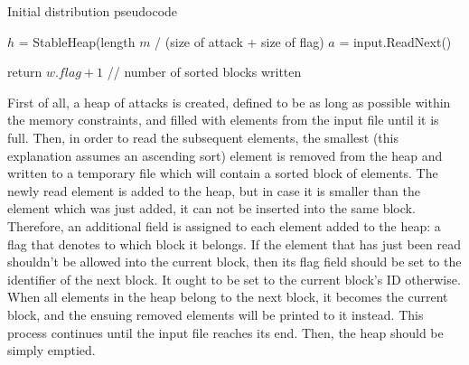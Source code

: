 \documentclass[10pt,a4paper]{article}
\begin{document}
\begin{algorithm}[H]
    \caption{Initial distribution pseudocode}


    \BlankLine
    $h$ = StableHeap(length $m$ / (size of attack + size of flag)\;
    $a$ = input.ReadNext()\;

    return $w.flag + 1$ // number of sorted blocks written\;
\end{algorithm}


First of all, a heap of attacks is created, defined to be as long as possible within the memory constraints, and filled with elements from the input file until it is full. Then, in order to read the subsequent elements, the smallest (this explanation assumes an ascending sort) element is removed from the heap and written to a temporary file which will contain a sorted block of elements. The newly read element is added to the heap, but in case it is smaller than the element which was just added, it can not be inserted into the same block. Therefore, an additional field is assigned to each element added to the heap: a flag that denotes to which block it belongs. If the element that has just been read shouldn't be allowed into the current block, then its flag field should be set to the identifier of the next block. It ought to be set to the current block's ID otherwise. When all elements in the heap belong to the next block, it becomes the current block, and the ensuing removed elements will be printed to it instead. This process continues until the input file reaches its end. Then, the heap should be simply emptied.
\end{document}
